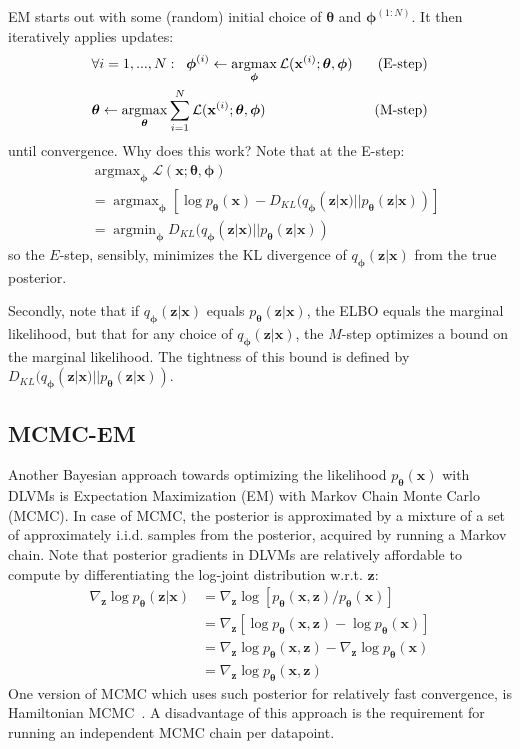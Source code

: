 \documentclass[MAL,biber]{nowfnt} %
\newcommand{\bb}[1]{\mathbf{#1}}
\newcommand{\bx}{\bb{x}}
\newcommand{\bz}{\bb{z}}
\newcommand{\bT}{\boldsymbol{\theta}}
\newcommand{\bphi}{\boldsymbol{\phi}}
\newcommand{\pT}{p_{\bT}}
\newcommand{\qP}{q_{\bphi}}
\DeclareMathOperator*{\argmin}{argmin}
\DeclareMathOperator*{\argmax}{argmax}
\begin{document}
EM starts out with some (random) initial choice of $\bT$ and $\bphi^{(1:N)}$. It then iteratively applies updates:
\begin{align}
&\forall i = 1, ..., N:\;\; \bphi^{(i)} \leftarrow \argmax_{\bphi} \mathcal{L}(\bx^{(i)}; \bT,\bphi) &\text{\;\;(E-step)}\\
&\bT \leftarrow \argmax_{\bT} \sum_{i=1}^N \mathcal{L}(\bx^{(i)}; \bT,\bphi) &\text{\;\;(M-step)} 
\end{align}
until convergence. Why does this work? Note that at the E-step:
\begin{align}
&\argmax_{\bphi} \mathcal{L}(\bx; \bT,\bphi) \\
&= \argmax_{\bphi} \left[ \log \pT(\bx) - D_{KL}(\qP(\bz|\bx)||\pT(\bz|\bx)) \right]\\
&= \argmin_{\bphi} D_{KL}(\qP(\bz|\bx)||\pT(\bz|\bx))
\end{align}
so the $E$-step, sensibly, minimizes the KL divergence of $\qP(\bz|\bx)$ from the true posterior.

Secondly, note that if $\qP(\bz|\bx)$ equals $\pT(\bz|\bx)$, the ELBO equals the marginal likelihood, but that for any choice of $\qP(\bz|\bx)$, the $M$-step optimizes a bound on the marginal likelihood. The tightness of this bound is defined by $D_{KL}(\qP(\bz|\bx)||\pT(\bz|\bx))$.

\subsection{MCMC-EM}
\label{sec:mcmcem}
Another Bayesian approach towards optimizing the likelihood $\pT(\bx)$ with DLVMs is Expectation Maximization (EM) with Markov Chain Monte Carlo (MCMC). In case of MCMC, the posterior is approximated by a mixture of a set of approximately i.i.d. samples from the posterior, acquired by running a Markov chain. Note that posterior gradients in DLVMs are relatively affordable to compute by differentiating the log-joint distribution w.r.t. $\bz$:
\begin{align}
\nabla_\bz \log \pT(\bz | \bx) 
&= \nabla_\bz \log [\pT(\bx, \bz)/\pT(\bx)]\\
&= \nabla_\bz [\log \pT(\bx, \bz) - \log \pT(\bx)]\\
&= \nabla_\bz \log \pT(\bx, \bz) - \nabla_\bz \log \pT(\bx)\\
&= \nabla_\bz \log \pT(\bx, \bz)
\end{align} 
One version of MCMC which uses such posterior for relatively fast convergence, is Hamiltonian MCMC~\citep{neal2011mcmc}. A disadvantage of this approach is the requirement for running an independent MCMC chain per datapoint.
\end{document}
